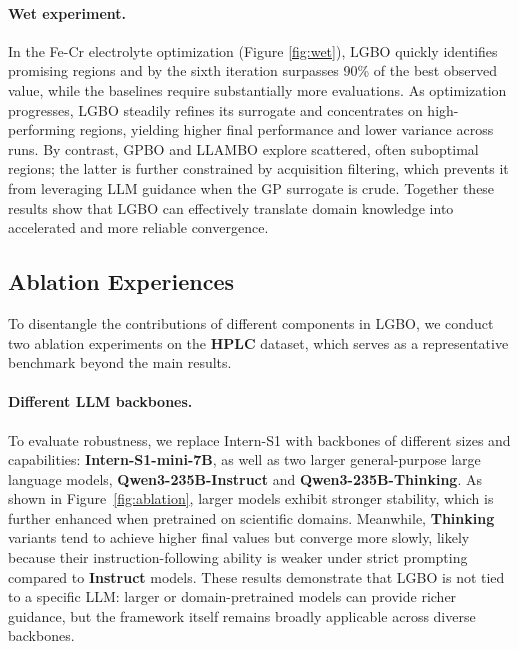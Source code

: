 \documentclass{article} %
\begin{document}
\paragraph{Wet experiment.} 
In the Fe-Cr electrolyte optimization (Figure \ref{fig:wet}), LGBO quickly identifies promising regions and by the sixth iteration surpasses 90\% of the best observed value, while the baselines require substantially more evaluations.
As optimization progresses, LGBO steadily refines its surrogate and concentrates on high-performing regions, yielding higher final performance and lower variance across runs. 
By contrast, GPBO and LLAMBO explore scattered, often suboptimal regions; the latter is further constrained by acquisition filtering, which prevents it from leveraging LLM guidance when the GP surrogate is crude. 
Together these results show that LGBO can effectively translate domain knowledge into accelerated and more reliable convergence.
\subsection{Ablation Experiences} 
To disentangle the contributions of different components in LGBO, we conduct two ablation experiments on the \textbf{HPLC} dataset, which serves as a representative benchmark beyond the main results.
\paragraph{Different LLM backbones.}  
To evaluate robustness, we replace Intern-S1 with backbones of different sizes and capabilities: 
\textbf{Intern-S1-mini-7B}, as well as two larger general-purpose large language models, \textbf{Qwen3-235B-Instruct} and \textbf{Qwen3-235B-Thinking}.  
As shown in Figure~\ref{fig:ablation}, larger models exhibit stronger stability, 
which is further enhanced when pretrained on scientific domains. 
Meanwhile, \textbf{Thinking} variants tend to achieve higher final values but converge more slowly, 
likely because their instruction-following ability is weaker under strict prompting compared to \textbf{Instruct} models.
These results demonstrate that LGBO is not tied to a specific LLM: larger or domain-pretrained models can 
provide richer guidance, but the framework itself remains broadly applicable across diverse backbones.
\end{document}
